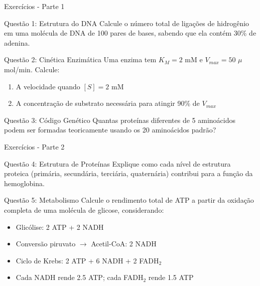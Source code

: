 \begin{frame}[allowframebreaks]{Exercícios - Parte 1}
\begin{block}{Questão 1: Estrutura do DNA}
Calcule o número total de ligações de hidrogênio em uma molécula de DNA de 100 pares de bases, sabendo que ela contém 30\% de adenina.
\end{block}

\begin{block}{Questão 2: Cinética Enzimática}
Uma enzima tem $K_M = 2$ mM e $V_{max} = 50$ $\mu$mol/min. Calcule:
\begin{enumerate}
    \item A velocidade quando $[S] = 2$ mM
    \item A concentração de substrato necessária para atingir 90\% de $V_{max}$
\end{enumerate}
\end{block}

\begin{block}{Questão 3: Código Genético}
Quantas proteínas diferentes de 5 aminoácidos podem ser formadas teoricamente usando os 20 aminoácidos padrão?
\end{block}
\end{frame}

\begin{frame}{Exercícios - Parte 2}
\begin{block}{Questão 4: Estrutura de Proteínas}
Explique como cada nível de estrutura proteica (primária, secundária, terciária, quaternária) contribui para a função da hemoglobina.
\end{block}

\begin{block}{Questão 5: Metabolismo}
Calcule o rendimento total de ATP a partir da oxidação completa de uma molécula de glicose, considerando:
\begin{itemize}
    \item Glicólise: 2 ATP + 2 NADH
    \item Conversão piruvato $\rightarrow$ Acetil-CoA: 2 NADH
    \item Ciclo de Krebs: 2 ATP + 6 NADH + 2 FADH$_2$
    \item Cada NADH rende 2.5 ATP; cada FADH$_2$ rende 1.5 ATP
\end{itemize}
\end{block}
\end{frame}

